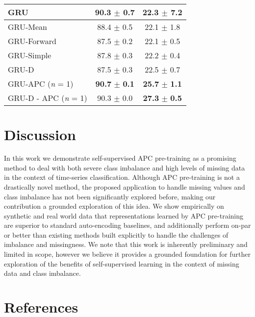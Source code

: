 \documentclass{article}
\begin{document}
\begin{table}[h!]
{{\begin{tabular}{lcc}
GRU & 90.3 $\pm$ 0.7 & 22.3 $\pm$ 7.2\\ 
\hline 
GRU-Mean & 88.4 $\pm$ 0.5 & 22.1 $\pm$ 1.8\\ 
\hline 
GRU-Forward &  87.5 $\pm$ 0.2 & 22.1 $\pm$ 0.5 \\ 
\hline 
GRU-Simple & 87.8 $\pm$ 0.3 & 22.2 $\pm$ 0.4\\ 
\hline 
GRU-D & 87.5 $\pm$ 0.3 & 22.5 $\pm$ 0.7 \\
\hline 
GRU-APC (\textit{n} = 1) & \textbf{90.7} $\pm$ \textbf{0.1} & \textbf{25.7} $\pm$ \textbf{1.1}\\
\hline 
GRU-D - APC (\textit{n} = 1) & 90.3 $\pm$ 0.0 & \textbf{27.3} $\pm$ \textbf{0.5} \\
\bottomrule
\end{tabular}}
}
\end{table}










\section{Discussion}
In this work we demonstrate self-supervised APC pre-training as a promising method to deal with both severe class imbalance and high levels of missing data in the context of time-series classification.
Although APC pre-training is not a drastically novel method, the proposed application to handle missing values and class imbalance has not been significantly explored before, making our contribution a grounded exploration of this idea.
We show empirically on synthetic and real world data that representations learned by APC pre-training are superior to standard auto-encoding baselines, and additionally perform on-par or better than existing methods built explicitly to handle the challenges of imbalance and missingness. We note that this work is inherently preliminary and limited in scope, however we believe it provides a grounded foundation for further exploration of the benefits of self-supervised learning in the context of missing data and class imbalance.


\section*{References}
\end{document}
